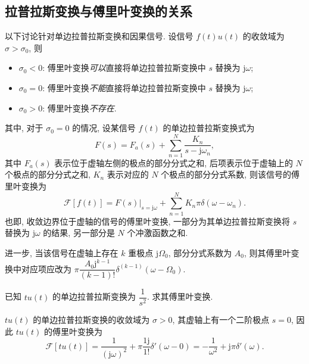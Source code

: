 \subsection{拉普拉斯变换与傅里叶变换的关系} \label{4 拉普拉斯变换与傅里叶变换的关系}
以下讨论针对单边拉普拉斯变换和因果信号. 设信号 $f(t)u(t)$ 的收敛域为 $\sigma>\sigma_0$, 则
\begin{itemize}
    \item \underline{$\sigma_0<0$}: 傅里叶变换\textit{可以}直接将单边拉普拉斯变换中 $s$ 替换为 $\mathrm{j}\omega$;
    \item \underline{$\sigma_0=0$}: 傅里叶变换\textit{不能}直接将单边拉普拉斯变换中 $s$ 替换为 $\mathrm{j}\omega$;
    \item \underline{$\sigma_0>0$}: 傅里叶变换\textit{不存在}.
\end{itemize}

其中, 对于 $\sigma_0=0$ 的情况, 设某信号 $f(t)$ 的单边拉普拉斯变换式为
\begin{equation}
    F(s)=F_a(s)+\sum_{n=1}^{N}\frac{K_n}{s-\mathrm{j}\omega_n},
\end{equation}
其中 $F_a(s)$ 表示位于虚轴左侧的极点的部分分式之和, 后项表示位于虚轴上的 $N$ 个极点的部分分式之和, $K_n$ 表示对应的 $N$ 个极点的部分分式系数, 则该信号的傅里叶变换为
\begin{equation}
    \mathcal{F}[f(t)]=F(s)|_{s=\mathrm{j}\omega}+\sum_{n=1}^{N}K_n\pi\delta(\omega-\omega_n).
\end{equation}
也即, 收敛边界位于虚轴的信号的傅里叶变换, 一部分为其单边拉普拉斯变换将 $s$ 替换为 $\mathrm{j}\omega$ 的结果, 另一部分是 $N$ 个冲激函数之和.

进一步, 当该信号在虚轴上存在 $k$ 重极点 $\mathrm{j}\Omega_0$, 部分分式系数为 $A_0$, 则其傅里叶变换中对应项应改为 $\pi\dfrac{A_0\mathrm{j}^{k-1}}{(k-1)!}\delta^{(k-1)}(\omega-\Omega_0)$.

\begin{exampleprob}
    已知 $tu(t)$ 的单边拉普拉斯变换为 $\dfrac{1}{s^2}$. 求其傅里叶变换.

    \begin{solution}
        $tu(t)$ 的单边拉普拉斯变换的收敛域为 $\sigma>0$, 其虚轴上有一个二阶极点 $s=0$, 因此 $tu(t)$ 的傅里叶变换为
        \begin{equation*}
            \mathcal{F}[tu(t)]=\frac{1}{(\mathrm{j}\omega)^2}+\pi\frac{1\mathrm{j}}{1!}\delta'(\omega-0)=-\frac{1}{\omega^2}+\mathrm{j}\pi\delta'(\omega).
        \end{equation*}
    \end{solution}
\end{exampleprob}
